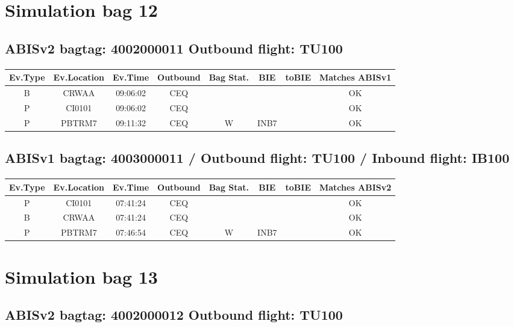 \documentclass{report}
\begin{document}
\section*{Simulation bag 12}
\subsection*{ABISv2 bagtag: 4002000011 Outbound flight: TU100}
\paragraph{}
\begin{longtable}{cccccccc}    \toprule
\rowcolor{white!50}
\textbf{Ev.Type} & \textbf{Ev.Location} & \textbf{Ev.Time} & \textbf{Outbound} & \textbf{Bag Stat.} & \textbf{BIE} & \textbf{toBIE} & \textbf{Matches ABISv1} \\\midrule
B & CRWAA & 09:06:02  & CEQ &  &  &  & OK\\
P & CI0101 & 09:06:02  & CEQ &  &  &  & OK\\
P & PBTRM7 & 09:11:32  & CEQ & W & INB7 &  & OK\\
\bottomrule
\end{longtable}
\subsection*{ABISv1 bagtag: 4003000011 / Outbound flight: TU100 / Inbound flight: IB100}
\paragraph{}
\begin{longtable}{cccccccc}    \toprule
\rowcolor{white!50}
\textbf{Ev.Type} & \textbf{Ev.Location} & \textbf{Ev.Time} & \textbf{Outbound} & \textbf{Bag Stat.} & \textbf{BIE} & \textbf{toBIE} & \textbf{Matches ABISv2} \\\midrule
P & CI0101 & 07:41:24  & CEQ &  &  &  & OK\\
B & CRWAA & 07:41:24  & CEQ &  &  &  & OK\\
P & PBTRM7 & 07:46:54  & CEQ & W & INB7 &  & OK\\
\bottomrule
\end{longtable}
\pagebreak
\section*{Simulation bag 13}
\subsection*{ABISv2 bagtag: 4002000012 Outbound flight: TU100}
\end{document}
